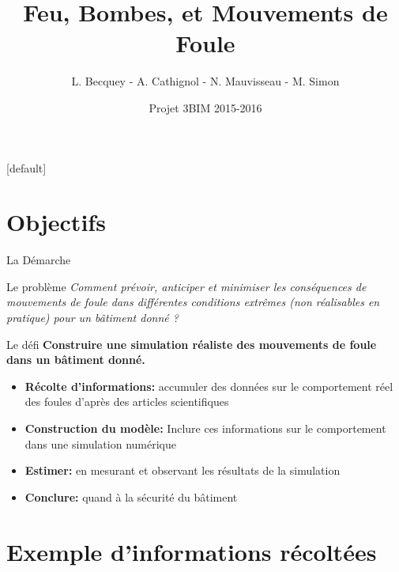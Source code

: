\documentclass[11pt]{beamer}
\author[ ]{L. Becquey - A. Cathignol - N. Mauvisseau - M. Simon}
\title{Feu, Bombes, et Mouvements de Foule}
\institute[ ]{INSA de Lyon\\ Bio-Informatique et Modélisation}
\date{Projet 3BIM 2015-2016}
\begin{document}
\begin{frame}
\titlepage
\end{frame}
[default]


\section{Objectifs}

\begin{frame}{La Démarche}
\begin{alertblock}{Le problème}
\footnotesize
\textit{Comment prévoir, anticiper et minimiser les conséquences de mouvements de foule dans différentes conditions extrêmes (non réalisables en pratique) pour un bâtiment donné ?}
\end{alertblock}
\begin{exampleblock}{Le défi}
\footnotesize
\textbf{Construire une simulation réaliste des mouvements de foule dans un bâtiment donné.}
\end{exampleblock}
\begin{itemize}
\item \textbf{Récolte d'informations:} accumuler des données sur le comportement réel des foules d'après des articles scientifiques
\item \textbf{Construction du modèle:} Inclure ces informations sur le comportement dans une simulation numérique
\item \textbf{Estimer:} en mesurant et observant les résultats de la simulation
\item \textbf{Conclure:} quand à la sécurité du bâtiment
\end{itemize}
\end{frame}
\section{Exemple d'informations récoltées}
\end{document}
